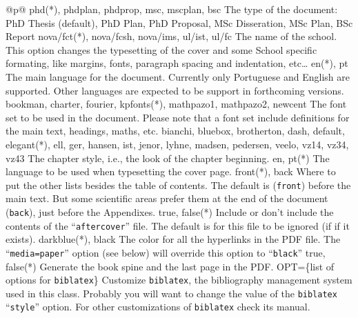 \noindent
\begin{ctabular}{@{}p{\linewidth}@{}}
  \toprule
    {phd(*), phdplan, phdprop, msc, mscplan, bsc}%
    {The type of the document: PhD Thesis (default), PhD Plan, PhD Proposal, MSc Disseration, MSc Plan, BSc Report}
    \midrule
		{nova/fct(*), nova/fcsh, nova/ims, ul/ist, ul/fc}%
    {The name of the school. This option changes the typesetting of the cover and some School specific formating, like margins, fonts, paragraph spacing and indentation, etc…}
    \midrule
    {en(*), pt}%
    {The main language for the document.  Currently only Portuguese and English are supported.  Other languages are expected to be support in forthcoming versions.}
    \midrule
    {bookman, charter, fourier, kpfonts(*), mathpazo1, mathpazo2, newcent}%
    {The font set to be used in the document.  Please note that a font set include definitions for the main text, headings, maths, etc.}
    \midrule
    {bianchi, bluebox, brotherton, dash, default, elegant(*), ell, ger, hansen, ist, jenor, lyhne, madsen, pedersen, veelo, vz14, vz34, vz43}%
    {The chapter style, i.e., the look of the chapter beginning.}
    \midrule
    {en, pt(*)}%
    {The language to be used when typesetting the cover page.}
    \midrule
    {front(*), back}%
    {Where to put the other lists besides the table of contents. The default is (\texttt{front}) before the main text.  But some scientific areas prefer them at the end of the document (\texttt{back}), just before the Appendixes.}
    \midrule
    {true, false(*)}%
    {Include or don't include the contents of the “\texttt{aftercover}” file. The default is for this file to be ignored (if if it exists).}
    \midrule
    {darkblue(*), black}%
    {The color for all the hyperlinks in the PDF file.  The “\texttt{media=paper}” option (see below) will override this option to “\texttt{black}”}
    \midrule
    {true, false(*)}%
    {Generate the book spine and the last page in the PDF.}
    \midrule
    {OPT=\{list of options for \texttt{biblatex}\}}%
    {Customize \texttt{biblatex}, the bibliography management system used in this class. Probably you will want to change the value of the \texttt{biblatex} “\texttt{style}” option. For other customizations of \texttt{biblatex} check its manual.}
    \midrule

\end{ctabular}
